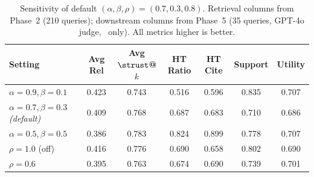 \begin{table}[t]
\centering\small
\caption{Sensitivity of \trustrag default $(\alpha,\beta,\rho)=(0.7,0.3,0.8)$. Retrieval columns from Phase~2 (210 queries); downstream columns from Phase~5 (35 queries, GPT-4o judge, \anchorrag\ only). All metrics higher is better.}
\label{tab:sensitivity-main}
\begin{tabular}{lcccccc}
\toprule
Setting & Avg Rel & Avg $\strust$@$k$ & HT Ratio & HT Cite & Support & Utility \\
\midrule
$\alpha{=}0.9,\beta{=}0.1$ & 0.423 & 0.743 & 0.516 & 0.596 & 0.835 & 0.707 \\
$\alpha{=}0.7,\beta{=}0.3$ \emph{(default)} & 0.409 & 0.768 & 0.687 & 0.683 & 0.710 & 0.686 \\
$\alpha{=}0.5,\beta{=}0.5$ & 0.386 & 0.783 & 0.824 & 0.899 & 0.778 & 0.707 \\
$\rho{=}1.0$ (off) & 0.416 & 0.776 & 0.690 & 0.658 & 0.802 & 0.690 \\
$\rho{=}0.6$ & 0.395 & 0.763 & 0.674 & 0.690 & 0.739 & 0.701 \\
\bottomrule
\end{tabular}
\end{table}
